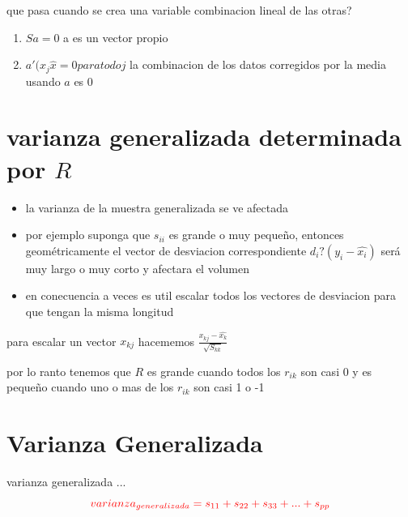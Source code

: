 \documentclass[10pt,a4paper]{article} %
\begin{document}
        que pasa cuando se crea una variable combinacion lineal de las otras?

        \begin{enumerate}
            \item { $ Sa = 0  $  a es un vector propio}
            \item {$ a'(x_j  \hat{x} =0 paratodo j  $   la combinacion de los
                datos corregidos por la media usando $ a  $ es 0}
        \end{enumerate}


    \section{varianza generalizada determinada por $ R  $ }
        \begin{itemize}
            \item {la varianza de la muestra generalizada se ve afectada}
            \item {por ejemplo suponga que $ s_{ii}  $  es grande o muy
                pequeño, entonces geométricamente el vector de desviacion
                correspondiente $ d_i ? (y_i - \hat{x_i}  )  $  será muy largo o
                muy corto y \color{red} afectara el volumen \color{white} }
            \item {en conecuencia a veces es util escalar todos los vectores de
                desviacion para que tengan la misma longitud}
        \end{itemize}

        para escalar un vector  $  x_{kj}  $  \color{red} hacememos $
        \frac{x_{kj}- \hat{x_k}}{\sqrt{S_{kk}} }   $  \color{white}

        por lo ranto tenemos que $ R  $ es grande cuando todos los $ r_{ik}
        $ son casi 0 y es pequeño cuando uno o mas de los $ r_{ik}  $  son casi
        1 o -1

    \section{Varianza Generalizada}
       varianza generalizada ...
       \begin{equation}
           \color{red} varianza_{generalizada} = s_{11} + s_{22} + s_{33} + ...
           + s_{pp}
            \color{white}
        \end{equation}












    \nocite{*}
    
    
\end{document}
